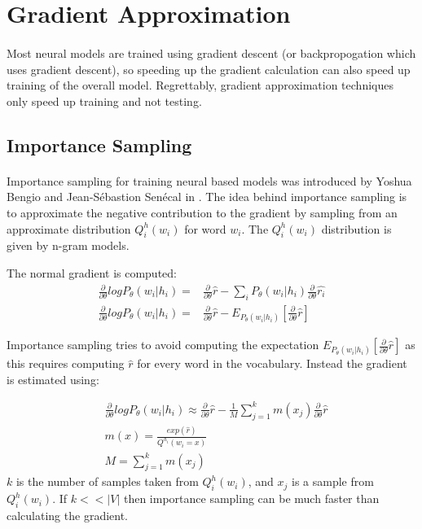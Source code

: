 \section{Gradient Approximation}
\paragraph{}
Most neural models are trained using gradient descent (or backpropogation which uses gradient descent), so speeding up the gradient calculation can also speed up training of the overall model. Regrettably, gradient approximation techniques only speed up training and not testing. 

\subsection{Importance Sampling}
\paragraph{}
Importance sampling for training neural based models was introduced by Yoshua Bengio and Jean-S\'{e}bastion Sen\'{e}cal in \cite{BengioSenecal2003}.
The idea behind importance sampling is to approximate the negative contribution to the gradient by sampling from an approximate distribution $Q^h_i(w_i)$ for word $w_i$. The $Q^h_i(w_i)$ distribution is given by n-gram models. 

The normal gradient is computed:
\begin{align}
\frac{\partial}{\partial \theta} log P_{\theta}(w_i| h_i) =& \frac{\partial}{\partial \theta} \hat{r} - \sum_i P_{\theta}(w_i| h_i) \frac{\partial}{\partial \theta} \hat{r_i} 
\\ \frac{\partial}{\partial \theta} log P_{\theta}(w_i| h_i) =& \frac{\partial}{\partial \theta} \hat{r} - E_{P_{\theta}(w_i| h_i)} \left[ \frac{\partial}{\partial \theta} \hat{r} \right] \nonumber
\end{align}

Importance sampling tries to avoid computing the expectation $E_{P_{\theta}(w_i| h_i)} \left[ \frac{\partial}{\partial \theta} \hat{r} \right]$ as this requires computing $\hat{r}$ for every word in the vocabulary. Instead the gradient is estimated using:

\begin{align}
&\frac{\partial}{\partial \theta} log P_{\theta}(w_i| h_i) \approx  \frac{\partial}{\partial \theta} \hat{r} - \frac{1}{M} \sum_{j=1}^k m(x_j) \frac{\partial}{\partial \theta} \hat{r}
\\ &m(x) =  \frac{exp(\hat{r})}{Q^{h_i}(w_i=x)} \nonumber
\\ &M= \sum_{j=1}^k m(x_j) \nonumber
\end{align}
$k$ is the number of samples taken from $Q^h_i(w_i)$, and $x_j$ is a sample from  $Q^h_i(w_i)$. If $k << |V|$ then importance sampling can be much faster than calculating the gradient.

